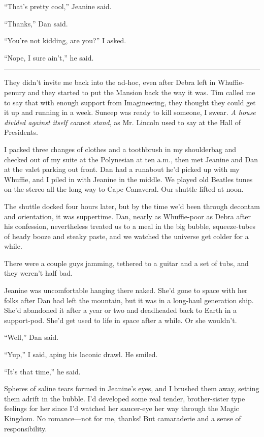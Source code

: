 “That's pretty cool,” Jeanine said.

“Thanks,” Dan said.

“You're not kidding, are you?” I asked.

“Nope, I sure ain't,” he said.

\begin{center}\rule{3in}{0.4pt}\end{center}

They didn't invite me back into the ad-hoc, even after Debra left
in Whuffie-penury and they started to put the Mansion back the way
it was. Tim called me to say that with enough support from
Imagineering, they thought they could get it up and running in a
week. Suneep was ready to kill someone, I swear.
\emph{A house divided against itself can}not \emph{stand}, as Mr.
Lincoln used to say at the Hall of Presidents.

I packed three changes of clothes and a toothbrush in my
shoulderbag and checked out of my suite at the Polynesian at ten
a.m., then met Jeanine and Dan at the valet parking out front. Dan
had a runabout he'd picked up with my Whuffie, and I piled in with
Jeanine in the middle. We played old Beatles tunes on the stereo
all the long way to Cape Canaveral. Our shuttle lifted at noon.

The shuttle docked four hours later, but by the time we'd been
through decontam and orientation, it was suppertime. Dan, nearly as
Whuffie-poor as Debra after his confession, nevertheless treated us
to a meal in the big bubble, squeeze-tubes of heady booze and
steaky paste, and we watched the universe get colder for a while.

There were a couple guys jamming, tethered to a guitar and a set of
tubs, and they weren't half bad.

Jeanine was uncomfortable hanging there naked. She'd gone to space
with her folks after Dan had left the mountain, but it was in a
long-haul generation ship. She'd abandoned it after a year or two
and deadheaded back to Earth in a support-pod. She'd get used to
life in space after a while. Or she wouldn't.

“Well,” Dan said.

“Yup,” I said, aping his laconic drawl. He smiled.

“It's that time,” he said.

Spheres of saline tears formed in Jeanine's eyes, and I brushed
them away, setting them adrift in the bubble. I'd developed some
real tender, brother-sister type feelings for her since I'd watched
her saucer-eye her way through the Magic Kingdom. No romance—not
for me, thanks! But camaraderie and a sense of responsibility.

